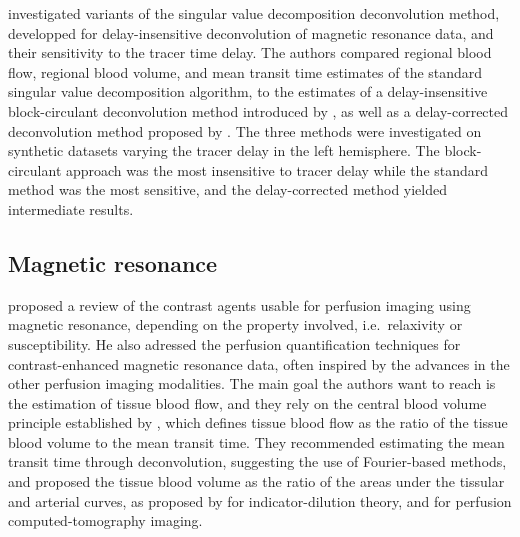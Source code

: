 \citet{Kudo:2009hy} investigated variants of the singular value decomposition deconvolution method, developped for delay-insensitive deconvolution of magnetic resonance data, and their sensitivity to the tracer time delay. 
The authors compared regional blood flow, regional blood volume, and mean transit time estimates of the standard singular value decomposition algorithm, to the estimates of a delay-insensitive block-circulant deconvolution method introduced by \citet{Wu:2003du}, as well as a delay-corrected deconvolution method proposed by \citet{Ibaraki:2005fn}.
The three methods were investigated on synthetic datasets varying the tracer delay in the left hemisphere.
The block-circulant approach was the most insensitive to tracer delay while the standard method was the most sensitive, and the delay-corrected method yielded intermediate results.

\subsection{Magnetic resonance}
\citet{Rosen:1990hz} proposed a review of the contrast agents usable for perfusion imaging using magnetic resonance, depending on the property involved, i.e.~relaxivity or susceptibility. 
He also adressed the perfusion quantification techniques for contrast-enhanced magnetic resonance data, often inspired by the advances in the other perfusion imaging modalities.
The main goal the authors want to reach is the estimation of tissue blood flow, and they rely on the central blood volume principle established by \citet{Stewart:1897dz}, which defines tissue blood flow as the ratio of the tissue blood volume to the mean transit time.
They recommended estimating the mean transit time through deconvolution, suggesting the use of Fourier-based methods, and proposed the tissue blood volume as the ratio of the areas under the tissular and arterial curves, as proposed by \citet{Lassen:1979vj} for indicator-dilution theory, and \citet{Axel:1980jg} for perfusion computed-tomography imaging.

